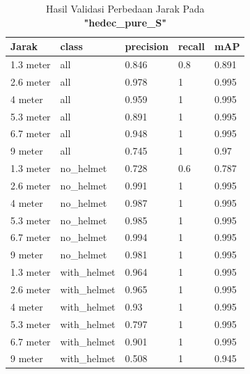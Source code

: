 \begin{enumerate}
  \begin{table}[ht]
    \centering
    \caption{Hasil Validasi Perbedaan Jarak Pada \textbf{"hedec\_pure\_S"}}
    \label{tb:hasiljarak_hedec_pure_S}
    \begin{tabular}{|l|l|l|l|l|} 
      \hline
      Jarak     & class        & precision & recall & mAP    \\ 
      \hline
      1.3 meter & all          & 0.846     & 0.8    & 0.891  \\
      2.6 meter & all          & 0.978     & 1      & 0.995  \\
      4 meter   & all          & 0.959     & 1      & 0.995  \\
      5.3 meter & all          & 0.891     & 1      & 0.995  \\
      6.7 meter & all          & 0.948     & 1      & 0.995  \\
      9 meter   & all          & 0.745     & 1      & 0.97   \\
      1.3 meter & no\_helmet   & 0.728     & 0.6    & 0.787  \\
      2.6 meter & no\_helmet   & 0.991     & 1      & 0.995  \\
      4 meter   & no\_helmet   & 0.987     & 1      & 0.995  \\
      5.3 meter & no\_helmet   & 0.985     & 1      & 0.995  \\
      6.7 meter & no\_helmet   & 0.994     & 1      & 0.995  \\
      9 meter   & no\_helmet   & 0.981     & 1      & 0.995  \\
      1.3 meter & with\_helmet & 0.964     & 1      & 0.995  \\
      2.6 meter & with\_helmet & 0.965     & 1      & 0.995  \\
      4 meter   & with\_helmet & 0.93      & 1      & 0.995  \\
      5.3 meter & with\_helmet & 0.797     & 1      & 0.995  \\
      6.7 meter & with\_helmet & 0.901     & 1      & 0.995  \\
      9 meter   & with\_helmet & 0.508     & 1      & 0.945  \\
      \hline
    \end{tabular}
  \end{table}


\end{enumerate}
